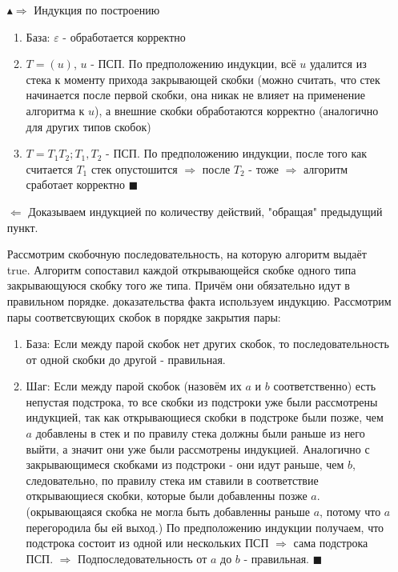\begin{itemize}
    \item[$\blacktriangle \Rightarrow$] Индукция по построению \begin{enumerate}
    \item База: $\varepsilon$ - обработается корректно
    \item $T=(u)$, $u$ - ПСП. По предположению индукции, всё $u$ удалится из стека к моменту прихода закрывающей скобки (можно считать, что стек начинается после первой скобки, она никак не влияет на применение алгоритма к $u$), а внешние скобки обработаются корректно (аналогично для других типов скобок)
    \item $T=T_1 T_2; T_1, T_2$ - ПСП. По предположению индукции, после того как считается $T_1$ стек опустошится $\Rightarrow$ после $T_2$ - тоже $\Rightarrow$ алгоритм сработает корректно $\blacksquare$
    \end{enumerate}
    \item[$\Leftarrow$] Доказываем индукцией по количеству действий, "обращая" предыдущий пункт.
    \par Рассмотрим скобочную последовательность, на которую алгоритм выдаёт true. Алгоритм сопоставил каждой открывающейся скобке одного типа закрывающуюся скобку того же типа. Причём они обязательно идут в правильном порядке. 
 доказательства факта используем индукцию.
Рассмотрим пары соответсвующих скобок в порядке закрытия пары:
\begin{enumerate}
    \item База: Если между парой скобок нет других скобок, то последовательность от одной скобки до другой - правильная.
    \item Шаг: Если между парой скобок (назовём их $a$ и $b$ соответственно) есть непустая подстрока, то все скобки из подстроки уже были рассмотрены индукцией, так как открывающиеся скобки в подстроке были позже, чем $a$ добавлены в стек и по правилу стека должны были раньше из него выйти, а значит они уже были рассмотрены индукцией. Аналогично с закрывающимеся скобками из подстроки - они идут раньше, чем $b$, следовательно, по правилу стека им ставили в соответствие открывающиеся скобки, которые были добавленны позже $a$. (окрывающаяся скобка не могла быть добавленны раньше $a$, потому что $a$ перегородила бы ей выход.) По предположению индукции получаем, что подстрока состоит из одной или нескольких ПСП $\Rightarrow$ сама подстрока ПСП. $\Rightarrow$ Подпоследовательность от $a$ до $b$ - правильная. $\blacksquare$
\end{enumerate}
\end{itemize} 